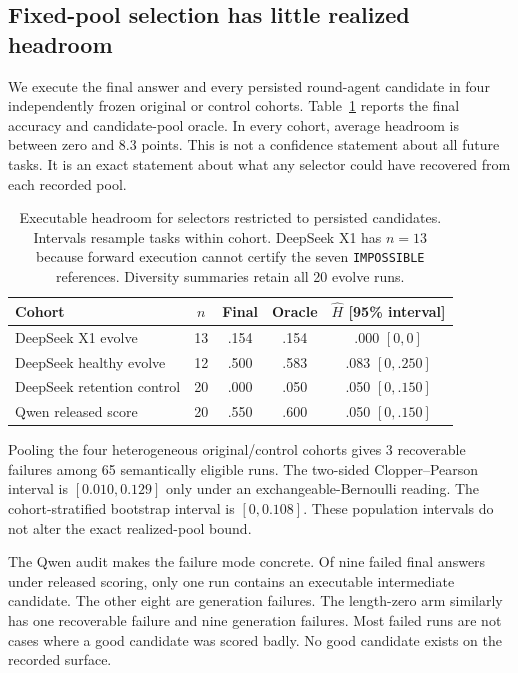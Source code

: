 \documentclass{article}
\begin{document}
\subsection{Fixed-pool selection has little realized headroom}

We execute the final answer and every persisted round-agent candidate in four independently frozen original or control cohorts. Table~\ref{tab:headroom} reports the final accuracy and candidate-pool oracle. In every cohort, average headroom is between zero and 8.3 points. This is not a confidence statement about all future tasks. It is an exact statement about what any selector could have recovered from each recorded pool.

\begin{table}[t]
\caption{Executable headroom for selectors restricted to persisted candidates. Intervals resample tasks within cohort. DeepSeek X1 has $n=13$ because forward execution cannot certify the seven \texttt{IMPOSSIBLE} references. Diversity summaries retain all 20 evolve runs.}
\label{tab:headroom}
\centering
\small
\begin{tabular}{lcccc}
\toprule
Cohort & $n$ & Final & Oracle & $\widehat H$ [95\% interval] \\
\midrule
DeepSeek X1 evolve & 13 & .154 & .154 & .000 $[0,0]$ \\
DeepSeek healthy evolve & 12 & .500 & .583 & .083 $[0,.250]$ \\
DeepSeek retention control & 20 & .000 & .050 & .050 $[0,.150]$ \\
Qwen released score & 20 & .550 & .600 & .050 $[0,.150]$ \\
\bottomrule
\end{tabular}
\end{table}

Pooling the four heterogeneous original/control cohorts gives 3 recoverable failures among 65 semantically eligible runs. The two-sided Clopper--Pearson interval is $[0.010,0.129]$ only under an exchangeable-Bernoulli reading. The cohort-stratified bootstrap interval is $[0,0.108]$. These population intervals do not alter the exact realized-pool bound.

The Qwen audit makes the failure mode concrete. Of nine failed final answers under released scoring, only one run contains an executable intermediate candidate. The other eight are generation failures. The length-zero arm similarly has one recoverable failure and nine generation failures. Most failed runs are not cases where a good candidate was scored badly. No good candidate exists on the recorded surface.
\end{document}
